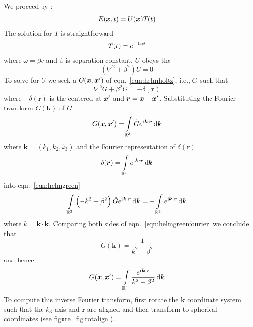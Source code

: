 We proceed by :
%
\begin{equation}
    E(\bm{x}, t) = U(\bm{x}) T(t)\label{eqn:sepvar}
\end{equation}
%
The solution for \(T\) is straightforward
%
\begin{equation}
    T(t) = e^{-\mathrm{i}\mkern1mu \omega t}
\end{equation}
%
where \(\omega = \beta c\) and \(\beta\) is separation constant.
%
\(U\) obeys the 
%
\begin{equation}
    (\nabla ^{2}+\beta^{2})U=0\label{eqn:helmholtz}
\end{equation}
%
To solve for \(U\) we seek a  \(G(\bm{x},\bm{x}')\) of eqn.~\eqref{eqn:helmholtz}, i.e., \(G\) such that
%
\begin{equation}
    \nabla^2 G + \beta^2 G = -\delta(\bm{r})\label{eqn:helmgreen}
\end{equation}
%
where \(-\delta(\bm{r})\) is the  centered at \(\bm{x}'\) and \(\bm{r} = \bm{x} - \bm{x}'\).
%
Substituting the Fourier transform \(\tilde{G}(\bm{k})\) of \(G\)
%
\begin{equation}
    G(\bx, \bx') = \int\limits_{\mathbb{R}^3} \tilde{G} e^{\iu \bm{k}\cdot \bm{r}} \dif \bm{k}
\end{equation}
%
where \(\bm{k} = \left(k_1, k_2, k_3\right)\) and the Fourier representation of \(\delta(\bm{r})\)
\begin{equation}
    \delta(\bm{r}) = \int\limits_{\mathbb{R}^3} e^{\iu \bm{k} \cdot \bm{r}} \dif \bm{k}
\end{equation}
%
into eqn.~\eqref{eqn:helmgreen}
%
\begin{equation}
    \int\limits_{\mathbb{R}^3} \left(-k^2 +\beta^2 \right) \tilde{G}e^{\iu \bm{k}\cdot \bm{r}} \dif \bm{k} = - \int\limits_{\mathbb{R}^3} e^{\iu \bm{k}\cdot \bm{r}} \dif \bm{k}\label{eqn:helmgreenfourier}
\end{equation}
%
where \(k = \bm{k}\cdot\bm{k}\).
%
Comparing both sides of eqn.~\eqref{eqn:helmgreenfourier} we conclude that
%
\begin{equation}
    \tilde{G}(\bm{k}) = \frac{1}{k^2-\beta^2}
\end{equation}
%
and hence
%
\begin{equation}
    G(\bx, \bx') = \int\limits_{\mathbb{R}^3} \frac{e^{\iu \bm{k}\cdot \bm{r}}}{k^2-\beta^2}  \dif \bm{k}
\end{equation}
%
To compute this inverse Fourier transform, first rotate the \(\bm{k}\) coordinate system such that the \(k_3\)-axis and \(\bm{r}\) are aligned and then transform to spherical coordinates (see figure~\ref{fig:rotalign}).
